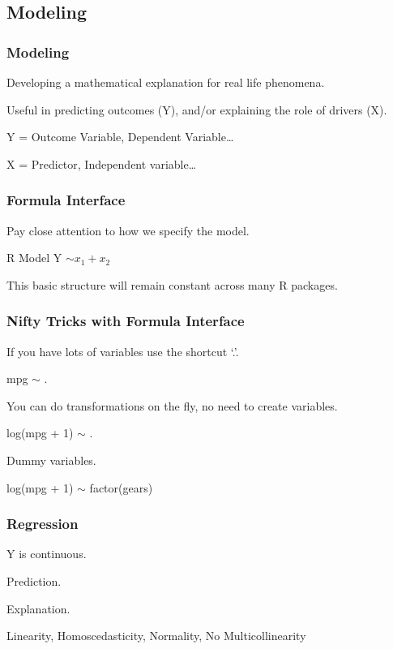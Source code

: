 \documentclass{beamer}\usepackage[]{graphicx}\usepackage[]{color}
\begin{document}
\subsection{Modeling}

\begin{frame}
\frametitle{Modeling}

Developing a mathematical explanation for real life phenomena.\vfill

Useful in predicting outcomes (Y), and/or explaining the role of drivers (X).\vfill

Y = Outcome Variable, Dependent Variable\ldots\vfill

X = Predictor, Independent variable\ldots\vfill

\end{frame}


\begin{frame}
\frametitle{Formula Interface}

Pay close attention to how we specify the model. \vfill

\begin{alertblock}{R Model}
		Y $\sim x_1 + x_2$
\end{alertblock}
\vfill

This basic structure will remain constant across many R packages.\vfill 

\end{frame}


\begin{frame}
\frametitle{Nifty Tricks with Formula Interface}

If you have lots of variables use the shortcut `.'.

\hspace{4em} mpg $\sim$ . \vfill

You can do transformations on the fly, no need to create variables.

\hspace{4em} log(mpg + 1) $\sim$ .\vfill

Dummy variables.

\hspace{4em} log(mpg + 1) $\sim$ factor(gears) \vfill

\end{frame}


\begin{frame}
\frametitle{Regression}

Y is continuous.\vfill

Prediction.\vfill

Explanation.\vfill

Linearity, Homoscedasticity, Normality, No Multicollinearity

\end{frame}
\end{document}
